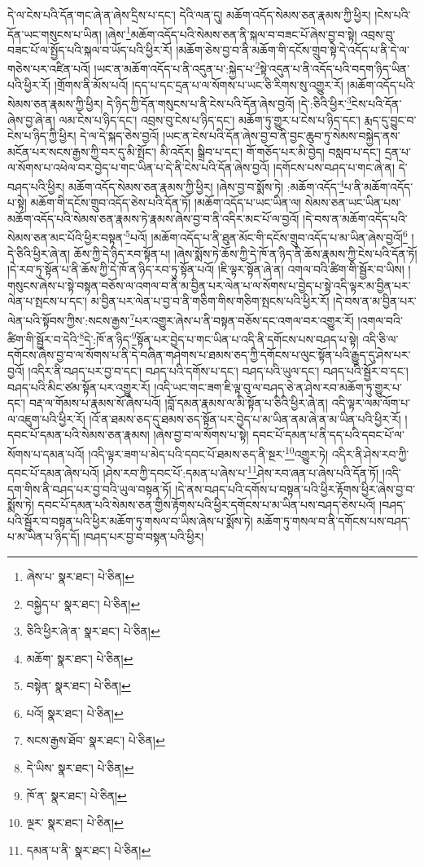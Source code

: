 དེ་ལ་ངེས་པའི་དོན་གང་ཞེ་ན་ཞེས་དྲིས་པ་དང་། དེའི་ལན་དུ། མཆོག་འདོད་སེམས་ཅན་རྣམས་ཀྱི་ཕྱིར། །ངེས་པའི་དོན་ཡང་གསུངས་པ་ཡིན། །ཞེས་\footnote{ཞེས་པ་  སྣར་ཐང་།  པེ་ཅིན། }མཆོག་འདོད་པའི་སེམས་ཅན་ནི་སྐལ་བ་བཟང་པོ་ཞེས་བྱ་བ་སྟེ། འབྲས་བུ་བཟང་པོ་ལ་སྤྱོད་པའི་སྐལ་བ་ཡོད་པའི་ཕྱིར་རོ། །མཆོག་ཅེས་བྱ་བ་ནི་མཆོག་གི་དངོས་གྲུབ་སྟེ་དེ་འདོད་པ་ནི་དེ་ལ་གཅེས་པར་འཛིན་པའོ། །ཡང་ན་མཆོག་འདོད་པ་ནི་འདུན་པ་:སྐྱེད་པ་\footnote{བསྐྱེད་པ་  སྣར་ཐང་།  པེ་ཅིན། }སྟེ་འདུན་པ་ནི་འདོད་པའི་བདག་ཉིད་ཡིན་པའི་ཕྱིར་རོ། །གྲོགས་ནི་མོས་པའོ། །དད་པ་དང་དྲན་པ་ལ་སོགས་པ་ཡང་ཅི་རིགས་སུ་འགྱུར་རོ། །མཆོག་འདོད་པའི་སེམས་ཅན་རྣམས་ཀྱི་ཕྱིར། དེ་ཉིད་ཀྱི་དོན་གསུངས་པ་ནི་ངེས་པའི་དོན་ཞེས་བྱའོ། །དེ་:ཅིའི་ཕྱིར་\footnote{ཅིའི་ཕྱིར་ཞེ་ན་  སྣར་ཐང་།  པེ་ཅིན། }ངེས་པའི་དོན་ཞེས་བྱ་ཞེ་ན། ལམ་ངེས་པ་ཉིད་དང་། འབྲས་བུ་ངེས་པ་ཉིད་དང་། མཆོག་ཏུ་གྱུར་པ་ངེས་པ་ཉིད་དང་། རྨད་དུ་བྱུང་བ་ངེས་པ་ཉིད་ཀྱི་ཕྱིར། དེ་ལ་དེ་སྐད་ཅེས་བྱའོ། །ཡང་ན་ངེས་པའི་དོན་ཞེས་བྱ་བ་ནི་བྱང་ཆུབ་ཏུ་སེམས་བསྐྱེད་ནས་མངོན་པར་སངས་རྒྱས་ཀྱི་བར་དུ་མི་སྤོང་། མི་འདོར། སྒྲིབ་པ་དང་། གོ་གཅོད་པར་མི་བྱེད། བསླབ་པ་དང་། དྲན་པ་ལ་སོགས་པ་འཕེལ་བར་བྱེད་པ་གང་ཡིན་པ་དེ་ནི་ངེས་པའི་དོན་ཞེས་བྱའོ། །དགོངས་པས་བཤད་པ་གང་ཞེ་ན། དེ་བཤད་པའི་ཕྱིར། མཆོག་འདོད་སེམས་ཅན་རྣམས་ཀྱི་ཕྱིར། །ཞེས་བྱ་བ་སྨོས་ཏེ། :མཆོག་འདོད་\footnote{མཆོག་  སྣར་ཐང་།  པེ་ཅིན། }པ་ནི་མཆོག་འདོད་པ་སྟེ། མཆོག་གི་དངོས་གྲུབ་འདོད་ཅེས་པའི་དོན་ཏོ། །མཆོག་འདོད་པ་ཡང་ཡིན་ལ། སེམས་ཅན་ཡང་ཡིན་པས་མཆོག་འདོད་པའི་སེམས་ཅན་རྣམས་ཏེ་རྣམས་ཞེས་བྱ་བ་ནི་འདིར་མང་པོ་ལ་བྱའོ། །དེ་བས་ན་མཆོག་འདོད་པའི་སེམས་ཅན་མང་པོའི་ཕྱིར་བསྟན་\footnote{བསྟེན་  སྣར་ཐང་།  པེ་ཅིན། }པའོ། །མཆོག་འདོད་པ་ནི་ཐུན་མོང་གི་དངོས་གྲུབ་འདོད་པ་མ་ཡིན་ཞེས་བྱའོ།\footnote{པའོ།  སྣར་ཐང་།  པེ་ཅིན། } །དེ་ཅིའི་ཕྱིར་ཞེ་ན། ཆོས་ཀྱི་དེ་ཉིད་རབ་སྟོན་པ། །ཞེས་སྨོས་ཏེ་ཆོས་ཀྱི་དེ་ཁོ་ན་ཉིད་ནི་ཆོས་རྣམས་ཀྱི་ངེས་པའི་དོན་ཏོ། །དེ་རབ་ཏུ་སྟོན་པ་ནི་ཆོས་ཀྱི་དེ་ཁོ་ན་ཉིད་རབ་ཏུ་སྟོན་པའོ། །ཇི་ལྟར་སྟོན་ཞེ་ན། འགལ་བའི་ཚིག་གི་སྦྱོར་བ་ཡིས། །གསུངས་ཞེས་པ་སྟེ་བསྟན་བཅོས་ལ་འགལ་བ་ནི་མ་བྱིན་པར་ལེན་པ་ལ་སོགས་པ་བྱེད་པ་སྟེ་འདི་ལྟར་མ་བྱིན་པར་ལེན་པ་སྤངས་པ་དང་། མ་བྱིན་པར་ལེན་པ་བྱ་བ་ནི་གཅིག་གིས་གཅིག་སྤངས་པའི་ཕྱིར་རོ། །དེ་བས་ན་མ་བྱིན་པར་ལེན་པའི་སྟོབས་ཀྱིས་:སངས་རྒྱས་\footnote{སངས་རྒྱས་ཐོབ་  སྣར་ཐང་།  པེ་ཅིན། }པར་འགྱུར་ཞེས་པ་ནི་བསྟན་བཅོས་དང་འགལ་བར་འགྱུར་རོ། །འགལ་བའི་ཚིག་གི་སྦྱོར་བ་དེའི་\footnote{དེ་ཡིས་  སྣར་ཐང་།  པེ་ཅིན། }དེ་:ཁོ་ན་ཉིད་\footnote{ཁོ་ན་  སྣར་ཐང་།  པེ་ཅིན། }སྟོན་པར་བྱེད་པ་གང་ཡིན་པ་འདི་ནི་དགོངས་པས་བཤད་པ་སྟེ། འདི་ཅི་ལ་དགོངས་ཞེས་བྱ་བ་ལ་སོགས་པ་ནི་དེ་བཞིན་གཤེགས་པ་ཐམས་ཅད་ཀྱི་དགོངས་པ་ལུང་སྟོན་པའི་རྒྱུད་དུ་ཤེས་པར་བྱའོ། །འདིར་ནི་བཤད་པར་བྱ་བ་དང་། བཤད་པའི་དགོས་པ་དང་། བཤད་པའི་ཡུལ་དང་། བཤད་པའི་སྦྱོར་བ་དང་། བཤད་པའི་མིང་ཙམ་སྟོན་པར་འགྱུར་རོ། །འདི་ཡང་གང་ཟག་ཇི་ལྟ་བུ་ལ་བཤད་ཅེ་ན་ཤེས་རབ་མཆོག་ཏུ་གྱུར་པ་དང་། བརྡ་ལ་གོམས་པ་རྣམས་སོ་ཞེས་པའོ། །བློ་དམན་རྣམས་ལ་མི་སྟོན་པ་ཅིའི་ཕྱིར་ཞེ་ན། འདི་ལྟར་ལམ་ལོག་པ་ལ་འཇུག་པའི་ཕྱིར་རོ། །འོ་ན་ཐམས་ཅད་དུ་ཐམས་ཅད་སྟོན་པར་བྱེད་པ་མ་ཡིན་ནམ་ཞེ་ན་མ་ཡིན་པའི་ཕྱིར་རོ། །དབང་པོ་དམན་པའི་སེམས་ཅན་རྣམས། །ཞེས་བྱ་བ་ལ་སོགས་པ་སྟེ། དབང་པོ་དམན་པ་ནི་དད་པའི་དབང་པོ་ལ་སོགས་པ་དམན་པའོ། །འདི་ལྟར་ཟག་པ་མེད་པའི་དབང་པོ་ཐམས་ཅད་ནི་སྔར་\footnote{ལྔར་  སྣར་ཐང་།  པེ་ཅིན། }འགྱུར་ཏེ། འདིར་ནི་ཤེས་རབ་ཀྱི་དབང་པོ་དམན་ཞེས་པའོ། །ཤེས་རབ་ཀྱི་དབང་པོ་:དམན་པ་ཞེས་པ་\footnote{དམན་པ་ནི་  སྣར་ཐང་།  པེ་ཅིན། }ཤེས་རབ་ཞན་པ་ཞེས་པའི་དོན་ཏོ། །འདི་དག་གིས་ནི་བཤད་པར་བྱ་བའི་ཡུལ་བསྟན་ཏོ། །དེ་ནས་བཤད་པའི་དགོས་པ་བསྟན་པའི་ཕྱིར་རྟོགས་ཕྱིར་ཞེས་བྱ་བ་སྨོས་ཏེ། དབང་པོ་དམན་པའི་སེམས་ཅན་གྱིས་རྟོགས་པའི་ཕྱིར་དགོངས་པ་མ་ཡིན་པས་བཤད་ཅེས་པའོ། །བཤད་པའི་སྦྱོར་བ་བསྟན་པའི་ཕྱིར་མཆོག་ཏུ་གསལ་བ་ཡིས་ཞེས་པ་སྨོས་ཏེ། མཆོག་ཏུ་གསལ་བ་ནི་དགོངས་པས་བཤད་པ་མ་ཡིན་པ་ཉིད་དོ། །བཤད་པར་བྱ་བ་བསྟན་པའི་ཕྱིར། 